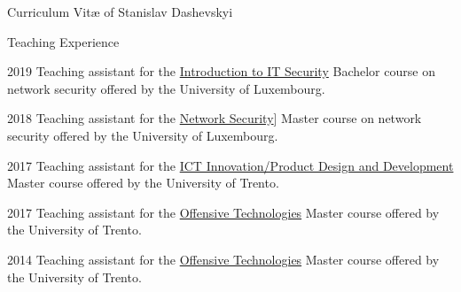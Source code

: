 \documentclass[11pt]{custom-style}
\begin{document}
\begin{cv}{Curriculum Vit\ae{} of Stanislav Dashevskyi}
\begin{cvlist}{Teaching Experience}
       \item[2019] Teaching assistant for the \href{http://satoss.uni.lu/courses/sec-intro/}{Introduction to IT Security}
                Bachelor course on network security offered by the University of Luxembourg.

      \item[2018] Teaching assistant for the \href{http://satoss.uni.lu/courses/networksecurity/}{Network Security}] 
                Master course on network security offered by the University of Luxembourg.

      \item[2017] Teaching assistant for the \href{https://securitylab.disi.unitn.it/doku.php?id=ict_innovation}{ICT
          Innovation/Product Design and Development} Master course offered by the University of Trento.

      \item[2017] Teaching assistant for the
          \href{http://securitylab.disi.unitn.it/doku.php?id=course_on_offensive_technologies}{Offensive Technologies}
            Master course offered by the University of Trento.

      \item[2014] Teaching assistant for the
          \href{http://securitylab.disi.unitn.it/doku.php?id=course_on_offensive_technologies}{Offensive Technologies}
            Master course offered by the University of Trento.

  \end{cvlist}

\end{cv}
\end{document}
